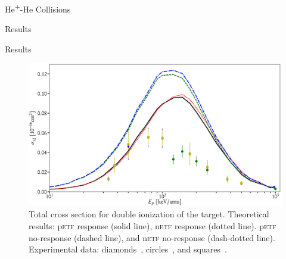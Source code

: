 \documentclass[letterpaper, 11 pt]{report}
\begin{document}
\begin{chapter}{\texorpdfstring{He\textsuperscript{+}}{He+}-He Collisions \label{chap:hephe}}
\begin{section}{Results \label{sec:hephe-disc}}
\begin{subsection}{Results \label{sec:hephe-res}}
         \begin{figure}[t]
            \centering
            \includegraphics[width = \linewidth]{./images/hephe-cross/HepHe-012.eps}
            \caption[Total cross section for double ionization of the target in He\textsuperscript{+}-He
                     collisions.]
                    {Total cross section for double ionization of the target.
                     Theoretical results: p\textsc{etf} response (solid line), n\textsc{etf} response
                                          (dotted line). p\textsc{etf} no-response (dashed line), and
                                          n\textsc{etf} no-response (dash-dotted line).
                     Experimental data: diamonds~\cite{Dub-89}, circles~\cite{FTFHLP-95}, and
                                        squares~\cite{DT-88}. \label{fig:cs012}}
         \end{figure}


\end{subsection}
\end{section}
\end{chapter}
\end{document}
